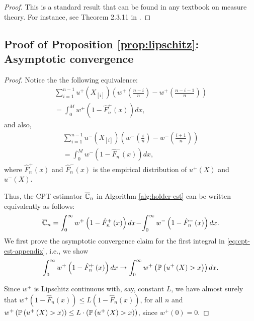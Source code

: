 \begin{proof}
This is a standard result that can be found in any textbook on measure theory. For instance, see Theorem 2.3.11 in \cite{athreya2006measure}.
\end{proof}


\subsection*{Proof of Proposition \ref{prop:lipschitz}: Asymptotic convergence}
\begin{proof}
Notice the the following equivalence: 
\begin{align*}
\sum_{i=1}^{n-1} u^+\left(X_{[i]}\right) \left(w^+\left(\frac{n-i}{n}\right) - w^+\left(\frac{n-i-1}{n}\right)\right) \\
=  \int_0^M w^+\left(1-\hat{F}^+_n\left(x\right)\right) dx, 
\end{align*}
and also,
\begin{align*}
\sum_{i=1}^{n-1} u^-\left(X_{[i]}\right) \left(w^-\left(\frac{i}{n}\right) - w^-\left(\frac{i+1}{n}\right)\right)\\
 =  \int_0^M w^-\left(1-\hat{F}^-_n\left(x\right)\right) dx, 
\end{align*}
where $\hat{F}^+_n\left(x\right)$ and $\hat{F}^-_n\left(x\right)$ is the empirical distribution of $u^+\left(X\right)$
and $u^-\left(X\right)$.

Thus, the CPT estimator $\overline {\mathbb{C}}_n$ in Algorithm \ref{alg:holder-est} can be written equivalently as follows:
\begin{align}
\overline {\mathbb{C}}_n = \int_0^{\infty} w^+\left(1-{\hat F_n}^+\left(x\right)\right)  dx \!-\! \int_0^{\infty} w^-\left(1-{\hat F_n}^-\left(x\right)\right)  dx.
\label{eq:cpt-est-appendix}
\end{align}
We first prove the asymptotic convergence claim for the first integral in \eqref{eq:cpt-est-appendix}, i.e., we show
\begin{align}
\int_0^{\infty} w^+\left(1-{\hat F_n}^+\left(x\right)\right)  dx \rightarrow \int_0^{\infty} w^+\left(\mathbb{P}\left( u^+\left(X\right)>x \right)\right) dx.\label{eq:3}
\end{align} 

Since $w^+$ is Lipschitz continuous with, say, constant $L$, we have almost surely that
$w^{+}\left(1-\hat{F}_n\left(x\right)\right) \leq L \left(1-\hat{F}_n\left(x\right)\right)$,  
for all $n$ and 
 $w^{+}\left(\mathbb{P}\left( u^+\left(X\right)>x \right)\right) \leq L\cdot \left(\mathbb{P}\left( u^+\left(X\right)>x \right)\right)$, since $w^+\left(0\right)=0$.
 

\end{proof}
